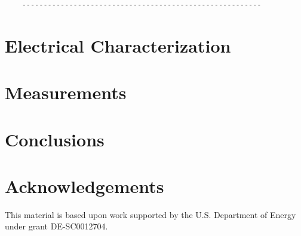 \documentclass[preprint,12pt]{elsarticle}
\begin{document}
\begin{verbatim}
    --------------------------------------------------------
\end{verbatim}






\section{Electrical Characterization}

 


\section{ Measurements}





\section{Conclusions}



\section{Acknowledgements}
This material is based upon work supported by the U.S. Department of Energy under grant DE-SC0012704.




{}
%
%
\end{document}
